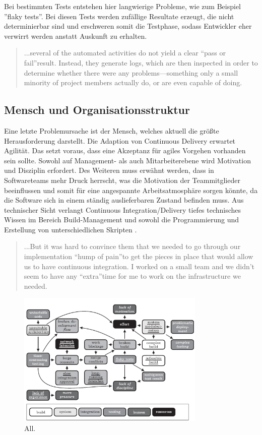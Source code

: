 Bei bestimmten Tests entstehen hier langwierige Probleme, wie zum Beispiel ''flaky tests''. Bei diesen Tests werden zufällige Resultate erzeugt, die nicht determinierbar sind und erschweren somit die Testphase, sodass Entwickler eher verwirrt werden anstatt Auskunft zu erhalten. 

\begin{quote}\glqq ...several of the automated activities do not yield a clear “pass or fail”result. Instead, they generate logs, which are then inspected in order to determine whether there were any problems—something only a small minority of project members actually do, or are even capable of doing. \grqq~\cite[S.65]{Laukkanen.2017}\end{quote}
%

\subsection{Mensch und Organisationsstruktur}
Eine letzte Problemursache ist der Mensch, welches aktuell die größte Herausforderung darstellt. Die Adaption von Continuous Delivery erwartet Agilität. Das setzt voraus, dass eine Akzeptanz für agiles Vorgehen vorhanden sein sollte. Sowohl auf Management- als auch Mitarbeiterebene wird Motivation und Disziplin erfordert. Des Weiteren muss erwähnt werden, dass in Softwareteams mehr Druck herrscht, was die Motivation der Teammitglieder beeinflussen und somit für eine angespannte Arbeitsatmosphäre sorgen könnte, da die Software sich in einem ständig auslieferbaren Zustand befinden muss. Aus technischer Sicht verlangt Continuous Integration/Delivery tiefes technisches Wissen im Bereich Build-Management und sowohl die Programmierung und Erstellung von unterschiedlichen Skripten \cite{Laukkanen.2017}. 

\begin{quote}\glqq ...But it was hard to convince them that we needed to go through our implementation “hump of pain”to get the pieces in place that would allow us to have continuous integration. I worked on a small team and we didn’t seem to have any “extra”time for me to work on the infrastructure we needed. \grqq~\cite[S.373]{Stolberg.2009}\end{quote}
%

\begin{figure}[ht]
	\centering
	\includegraphics[width=0.8\textwidth,]{images/all}
	\caption{All\cite{Laukkanen.2017}.}
	\label{integrationsprobleme}
\end{figure}